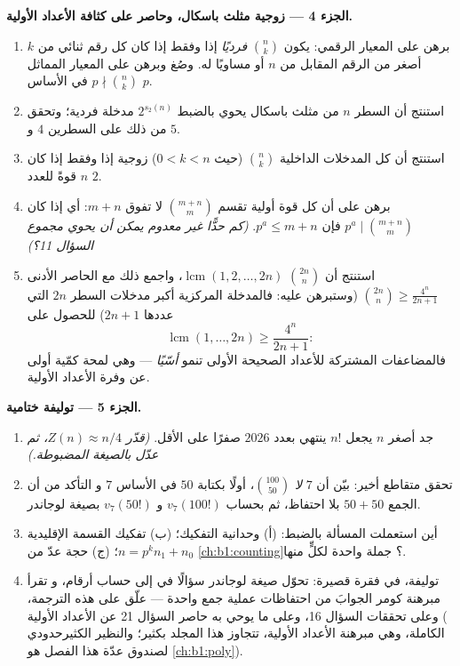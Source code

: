 \begin{problem}
\medskip
\noindent\textbf{الجزء 4 --- زوجية مثلث باسكال، وحاصر
على كثافة الأعداد الأولية.}
\begin{enumerate}[resume]
  \item برهن على المعيار الرقمي: يكون $\binom nk$ \emph{فرديًا} إذا
        وفقط إذا كان كل رقم ثنائي من $k$ أصغر من الرقم
        المقابل من $n$ أو مساويًا له. وصُغ وبرهن على المعيار المماثل  $p \nmid \binom nk$ في الأساس $p$.
  \item استنتج أن السطر $n$ من مثلث باسكال يحوي بالضبط
        $2^{s_2(n)}$ مدخلة فردية؛ وتحقق من ذلك على السطرين $4$ و $5$.
  \item استنتج أن كل المدخلات الداخلية $\binom nk$ (حيث $0 < k < n$)
        زوجية إذا وفقط إذا كان $n$ قوةً للعدد $2$.
  \item برهن على أن كل قوة أولية تقسم $\binom{m+n}m$ لا تفوق
        $m + n$: أي إذا كان $p^a \mid \binom{m+n}m$ فإن $p^a \leq
        m + n$. \emph{(كم حدًّا غير معدوم يمكن أن يحوي مجموع
        السؤال 11؟)}
  \item استنتج أن $\binom{2n}n$ 
        $\operatorname{lcm}(1, 2, \dots, 2n)$، واجمع ذلك مع
        الحاصر الأدنى $\binom{2n}n \geq \frac{4^n}{2n+1}$
        (وستبرهن عليه: فالمدخلة المركزية أكبر
        مدخلات السطر $2n$ التي عددها $2n + 1$) للحصول على
        \[
        \operatorname{lcm}(1, \dots, 2n) \geq \frac{4^n}{2n+1} :
        \]
        فالمضاعفات المشتركة للأعداد الصحيحة الأولى تنمو
        \emph{أسّيًا} --- وهي لمحة كمّية أولى عن
        وفرة الأعداد الأولية.
\end{enumerate}

\medskip
\noindent\textbf{الجزء 5 --- توليفة ختامية.}
\begin{enumerate}[resume]
  \item جد أصغر $n$ يجعل $n!$ ينتهي بعدد $2026$ صفرًا على
        الأقل. \emph{(قدّر $Z(n) \approx n/4$، ثم
        عدّل بالصيغة المضبوطة.)}
  \item تحقق متقاطع أخير: بيّن أن $7$ \emph{لا} 
        $\binom{100}{50}$، أولًا بكتابة $50$ في الأساس $7$ و
        التأكد من أن الجمع $50 + 50$ بلا احتفاظ، ثم
        بحساب $v_7(100!)$ و $v_7(50!)$ بصيغة
        لوجاندر.
  \item أين استعملت المسألة بالضبط: (أ) وحدانية
        التفكيك؛ (ب) تفكيك القسمة الإقليدية
        $n = p^k n_1 + n_0$؛ (ج) حجة عدّ من
        \cref{ch:b1:counting}؟ جملة واحدة لكلٍّ منها.
  \item توليفة، في فقرة قصيرة: تحوّل صيغة لوجاندر
        سؤالًا في  إلى حساب أرقام، و
        تقرأ مبرهنة كومر الجوابَ من احتفاظات عملية جمع
        واحدة --- علّق على هذه الترجمة، وعلى تحققات
        السؤال 16، وعلى ما يوحي به حاصر السؤال 21
        عن الأعداد الأولية ( الكاملة، وهي مبرهنة
        الأعداد الأولية، تتجاوز هذا المجلد بكثير؛ والنظير
        الكثيرحدودي لصندوق عدّة هذا الفصل هو
        \cref{ch:b1:poly}).
\end{enumerate}
\end{problem}
